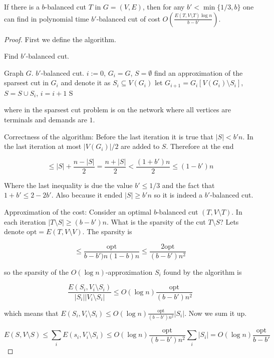 \begin{thm}
	If there is a $b$-balanced cut $T$ in $G = (V,E)$, then for any $b' < \min\{1/3, b\}$ one can find in polynomial time $b'$-balanced cut of cost $O \left(\frac{E(T, V \setminus T) \log n}{b-b'}\right)$.
\end{thm}

\begin{proof}
	First we define the algorithm.
	
	\begin{algorithm}
		\caption{Find $b'$-balanced cut.}
		\begin{algorithmic}[1]
			\Require Graph $G$.
			\Ensure $b'$-balanced cut.
			\State $i := 0$, $G_{i} = G$, $S = \emptyset$
			\State find an approximation of the sparsest cut in $G_{i}$ and denote it as $S_{i} \subseteq V(G_{i})$
			\State let $G_{i+1} = G_{i}[V(G_{i}) \setminus S_{i}]$, $S = S \cup S_{i}$, $i = i+1$
			\EndWhile
			\State \Return S
		\end{algorithmic}
	\end{algorithm}
	
	where in the sparsest cut problem is on the network where all vertices are terminals and demands are $1$.
	
	Correctness of the algorithm: Before the last iteration it is true that $|S| < b'n$. In the last iteration at most $|V(G_{i})| / 2$ are added to $S$. Therefore at the end
	
	$$
	\leq |S| + \frac{n - |S|}{2} = \frac{n + |S|}{2} < \frac{(1+ b')n}{2} \leq (1- b')n
	$$
	
	Where the last inequality is due the value $b' \leq 1/3$ and the fact that $1+b' \leq 2-2b'$. Also because it ended $|S| \geq b'n$ so it is indeed a $b'$-balanced cut.
	
	Approximation of the cost:	Consider an optimal $b$-balanced cut $(T, V \setminus T)$. In each iteration $|T \setminus S| \geq (b - b') n$. What is the sparsity of the cut $T \setminus S$? Lets denote $\text{opt} = E(T, V \setminus V)$. The sparsity is
	
	$$
	\leq \frac{\text{opt}}{b - b')n(1-b)n} \leq \frac{2 \text{opt}}{(b-b')n^{2}}
	$$
	
	so the sparsity of the $O(\log n)$-approximation $S_{i}$ found by the algorithm is
	
	$$
	\frac{E(S_{i}, V_{i} \setminus S_{i})}{|S_{i}| |V_{i} \setminus S_{i}|} \leq O(\log n) \frac{\text{opt}}{(b-b')n^{2}}
	$$
	
	which means that $E(S_{i}, V_{i} \setminus S_{i}) \leq O(\log n) \frac{\text{opt}}{(b-b')n^{2}} |S_{i}|$. Now we sum it up.
	
	$$
	E(S, V \setminus S) \leq \sum_{i} E(s_{i}, V_{i} \setminus S_{i}) \leq O(\log n) \frac{\text{opt}}{(b-b')n^{2}} \sum_{i} |S_{i}| = O(\log n) \frac{\text{opt}}{b - b'}
	$$
\end{proof}

